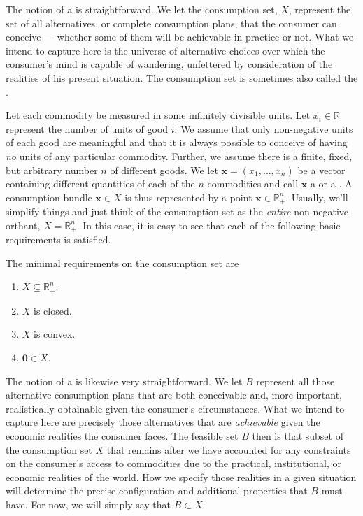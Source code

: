 \documentclass[b5paper]{memoir}
\begin{document}
The notion of a  is straightforward. We let the consumption set, $X$,
represent the set of all alternatives, or complete consumption plans, that the consumer
can conceive --- whether some of them will be achievable in practice or not. What we
intend to capture here is the universe of alternative choices over which the consumer’s
mind is capable of wandering, unfettered by consideration of the realities of his present
situation. The consumption set is sometimes also called the .

Let each commodity be measured in some infinitely divisible units. Let $x_i \in \mathbb{R}$
represent the number of units of good $i$. We assume that only non-negative units of each
good are meaningful and that it is always possible to conceive of having \emph{no} units
of any particular commodity. Further, we assume there is a finite, fixed, but arbitrary
number $n$ of different goods. We let $\mathbf x = (x_1, \ldots, x_n )$ be a vector
containing different quantities of each of the $n$ commodities and call $\mathbf x$ a
 or a . A consumption bundle
$\mathbf x \in X$ is thus represented by a point $\mathbf x \in \mathbb{R}^n_+$. Usually,
we’ll simplify things and just think of the consumption set as the \emph{entire}
non-negative orthant, $X = \mathbb{R}^n_+$. In this case, it is easy to see that each 
of the following basic requirements is satisfied.

\begin{assump}
The minimal requirements on the consumption set are
\begin{enumerate} 
\item $X \subseteq \mathbb{R}^n_+$.
\item $X$ is closed.
\item $X$ is convex.
\item $\mathbf 0 \in X$.
\end{enumerate}
\end{assump}

The notion of a  is likewise very straightforward. We let $B$ represent
all those alternative consumption plans that are both conceivable and, more important,
realistically obtainable given the consumer’s circumstances. What we intend to capture
here are precisely those alternatives that are \emph{achievable} given the economic
realities the consumer faces. The feasible set $B$ then is that subset of the consumption
set $X$ that remains after we have accounted for any constraints on the consumer’s access
to commodities due to the practical, institutional, or economic realities of the world.
How we specify those realities in a given situation will determine the precise
configuration and additional properties that $B$ must have. 
For now, we will simply say that $B \subset X$.
\end{document}
